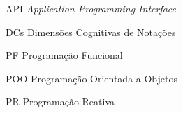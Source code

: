 \begin{siglas}
\item [API] \emph{Application Programming Interface}
  \item[DCs] Dimensões Cognitivas de Notações
  \item[PF] Programação Funcional
  \item[POO] Programação Orientada a Objetos
  \item[PR] Programação Reativa
\end{siglas}

